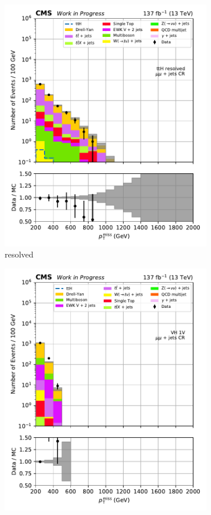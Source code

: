 \begin{figure}[htbp]
\begin{subfigure}[b]{0.24\textwidth}
        \includegraphics[width=\textwidth]{figures/region_plots/2016to18/region_2/ttH_resolved.pdf}
        \caption{\ttH resolved}
    \end{subfigure}
    \hfill
    \begin{subfigure}[b]{0.24\textwidth}
        \includegraphics[width=\textwidth]{figures/region_plots/2016to18/region_2/VH_1V.pdf}

\end{subfigure}
\end{figure}
